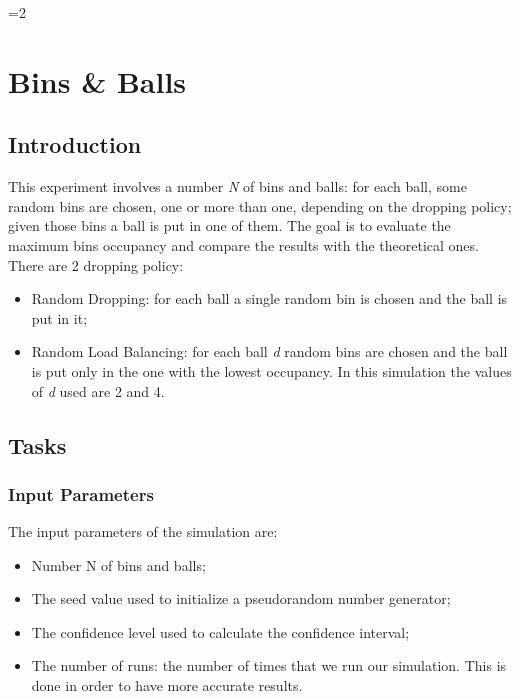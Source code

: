\documentclass[twocolumn,letterpaper]{report}
\newcounter{debug}
\begin{document}
\ifnum\value{debug}=2 {
    
\chapter{Bins \& Balls}
	 
	\section{Introduction}
	 
	This experiment involves a number \emph{N} of bins and balls: for each ball, some random bins are chosen, one or more than one, depending on the dropping policy; given those bins a ball is put in one of them.	The goal is to evaluate the maximum bins occupancy and compare the results with the theoretical ones. \\
	 There are 2 dropping policy:
	\begin{itemize}
		\item Random Dropping: for each ball a single random bin is chosen and the ball is put in it; 
		\item Random Load Balancing: for each ball \emph{d} random bins are chosen and the ball is put only in the one with the lowest occupancy. In this simulation the values of \emph{d} used are 2 and 4.
	\end{itemize}

	\section{Tasks}
	 
		\subsection{Input Parameters}
			The input parameters of the simulation are:
			\begin{itemize}
				\item Number N of bins and balls;
				\item The seed value used to initialize a pseudorandom number generator;
				\item The confidence level used to calculate the confidence interval;
				\item The number of runs: the number of times that we run our simulation. This is done in order to have more accurate results.
			\end{itemize}
			 
}
\end{document}
